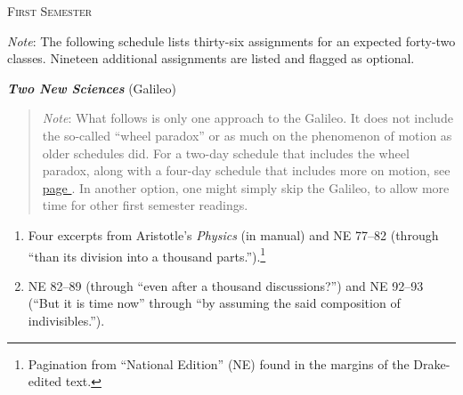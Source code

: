 \documentclass[10pt]{article}
\begin{document}


\newpage

\begin{center}
  \textsc{\small{First Semester}}
\end{center} 
\label{First}
{\small \emph{Note}: The following schedule 
lists thirty-six assignments for an expected forty-two classes.
Nineteen additional assignments are listed and flagged as optional.}

\textbf{\emph{Two New Sciences}} (Galileo)
\vspace{-0.2em}
  \begin{quote}
    \small{\emph{Note}: What follows is only one approach to the Galileo.
    It does not include the so-called ``wheel paradox'' 
    or as much on the phenomenon of motion 
    as older schedules did.  
    For a two-day schedule that includes 
    the wheel paradox, along with a four-day schedule
    that includes more on motion,
    see \hyperref[Galileo]{page \pageref{Galileo}}.
    In another option, one might simply skip the Galileo,
    to allow more time for other first semester readings.} 
  \end{quote}
  \begin{enumerate}[noitemsep]
    \item Four excerpts from Aristotle's \emph{Physics}
		(in manual) and NE 77--82 (through ``than
		its division into a thousand
		parts.'').\footnote{Pagination from
			``National Edition'' (NE) found in
			the margins of the Drake-edited
			text.} \item  NE 82--89 (through
		``even after a thousand discussions?'') and
		NE 92--93 (``But it is time now'' through
		``by assuming the said composition of
		indivisibles.'').  \end{enumerate}
\end{document}
